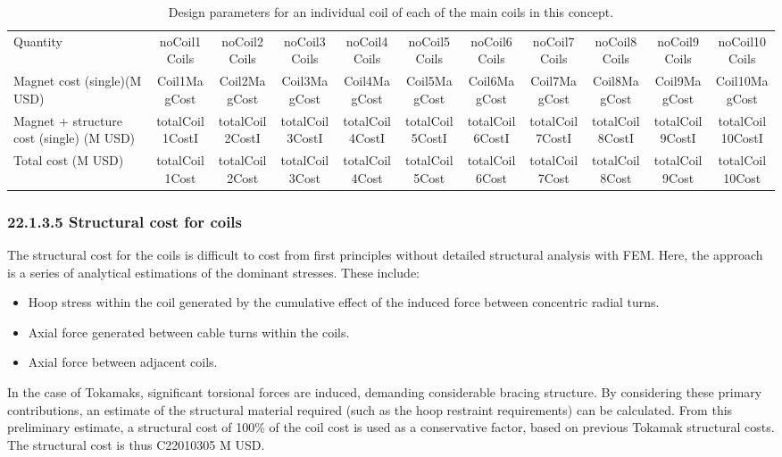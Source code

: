 \begin{table}[h]
{\begin{tabular}{lcccccccccc}
Quantity & noCoil1Coils & noCoil2Coils & noCoil3Coils & noCoil4Coils & noCoil5Coils & noCoil6Coils & noCoil7Coils & noCoil8Coils & noCoil9Coils & noCoil10Coils \\
Magnet cost (single)(M USD) & Coil1MagCost & Coil2MagCost & Coil3MagCost & Coil4MagCost & Coil5MagCost & Coil6MagCost & Coil7MagCost & Coil8MagCost & Coil9MagCost & Coil10MagCost \\
Magnet + structure cost (single) (M USD) & totalCoil1CostI & totalCoil2CostI & totalCoil3CostI & totalCoil4CostI & totalCoil5CostI & totalCoil6CostI & totalCoil7CostI & totalCoil8CostI & totalCoil9CostI & totalCoil10CostI \\
\hline
Total cost (M USD) & totalCoil1Cost & totalCoil2Cost & totalCoil3Cost & totalCoil4Cost & totalCoil5Cost & totalCoil6Cost & totalCoil7Cost & totalCoil8Cost & totalCoil9Cost & totalCoil10Cost \\
\hline
\end{tabular}}
\caption{Design parameters for an individual coil of each of the main coils in this concept.}
\label{your-table-label}
\end{table}


\subsubsection*{22.1.3.5 Structural cost for coils}

The structural cost for the coils is difficult to cost from first principles without detailed structural analysis with FEM. Here, the approach is a series of analytical estimations of the dominant stresses. These include:

\begin{itemize}
    \item Hoop stress within the coil generated by the cumulative effect of the induced force between concentric radial turns.
    \item Axial force generated between cable turns within the coils. 
    \item Axial force between adjacent coils.
\end{itemize}


In the case of Tokamaks, significant torsional forces are induced, demanding considerable bracing structure. By considering these primary contributions, an estimate of the structural material required (such as the hoop restraint requirements) can be calculated. From this preliminary estimate, a structural cost of 100\% of the coil cost is used as a conservative factor, based on previous Tokamak structural costs. The structural cost is thus C22010305 M USD.


